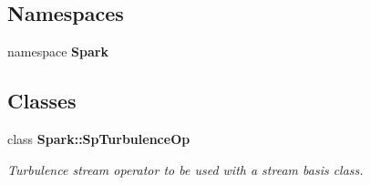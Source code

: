 \subsection*{Namespaces}
\begin{CompactItemize}
\item 
namespace {\bf Spark}
\end{CompactItemize}
\subsection*{Classes}
\begin{CompactItemize}
\item 
class {\bf Spark::Sp\-Turbulence\-Op}
\begin{CompactList}\small\item\em Turbulence stream operator to be used with a stream basis class. \item\end{CompactList}\end{CompactItemize}
